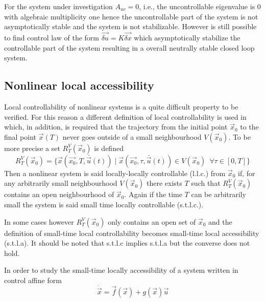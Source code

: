 For the system under investigation $A_{uc} = 0$, i.e., the uncontrollable eigenvalue is $0$ with algebraic
multiplicity one hence the uncontrollable part of the system is not asymptotically stable and the system
is not stabilizable. However is still possible to find control law of the form $\vec{\delta u} = K \vec{\delta x}$
which asymptotically stabilize the controllable part of the system resulting in a overall neutrally stable
closed loop system.
\subsection{Nonlinear local accessibility}
Local controllability of nonlinear systems is a quite difficult property to be verified.
For this reason a different definition of local controllability is used in which,
in addition, is required that the trajectory from the initial point $\vec{x}_0$ to the
final point $\vec{x}(T)$ never goes outside of a small neighbourhood $V(\vec{x}_0)$.
To be more precise a set $R_{T}^{V}(\vec{x}_0)$ is defined
\[
R_{T}^{V}(\vec{x}_0) = \{\vec{x}(\vec{x_0}, T, \bar{\vec{u}}(t)) \mid
\vec{x}(\vec{x_0}, \tau, \bar{\vec{u}}(t)) \in V(\vec{x}_0) \enspace \forall \tau \in [0,T]\}
\]
Then a nonlinear system is said locally-locally controllable (l.l.c.) from $\vec{x}_0$ if,
for any arbitrarily small neighbourhood $V(\vec{x}_0)$ there exists $T$ such that
$R_{T}^{V}(\vec{x}_0)$ contains an open neighbourhood of $\vec{x}_0$.
Again if the time $T$ can be arbitrarily small the system is said
small time locally controllable (s.t.l.c.).
\par
In some cases however $R_{T}^{V}(\vec{x}_0)$ only contains an open set of $\vec{x}_0$
and the definition of small-time local controllability becomes small-time local accessibility
(s.t.l.a). It should be noted that s.t.l.c implies s.t.l.a but the converse does not hold.
\par
In order to study the small-time locally accessibility of a system written in control affine form
\begin{equation}\label{eq:nonlinear_system}
\dot{\vec{x}} = \vec{f}(\vec{x}) + g(\vec{x}) \vec{u}
\end{equation}

